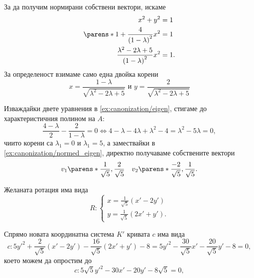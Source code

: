 \documentclass{../../common/topic}
\begin{document}
\begin{solution}
\begin{enumerate}
    За да получим нормирани собствени вектори, искаме
    \begin{align*}
      x^2 + y^2 &= 1 \\
      \parens*{1 +  \frac 4 {{(1 - \lambda)}^2} } x^2 &= 1 \\
      \frac {\lambda^2 - 2\lambda + 5} {{(1 - \lambda)}^2} x^2 &= 1.
    \end{align*}
    За определеност взимаме само една двойка корени
    \begin{equation}
      \label{ex:canonization/normed_eigen}
      x = \frac {1 - \lambda} {\sqrt{\lambda^2 - 2\lambda + 5}}
      \text{ и }
      y = \frac 2 {\sqrt{\lambda^2 - 2\lambda + 5}}
    \end{equation}

    Изваждайки двете уравнения в \eqref{ex:canonization/eigen}, стигаме до характеристичния полином на \( A \):
    \begin{equation*}
      \frac {4 - \lambda} 2 - \frac 2 {1 - \lambda} = 0 \iff 4 - \lambda - 4\lambda + \lambda^2 - 4 = \lambda^2 - 5\lambda = 0,
    \end{equation*}
    чиито корени са \( \lambda_1 = 0 \) и \( \lambda_1 = 5 \), а замествайки в \eqref{ex:canonization/normed_eigen}, директно получаваме собствените вектори
    \begin{align*}
      v_1 \parens*{\frac 1 {\sqrt 5}, \frac 2 {\sqrt 5} }
      &&
      v_2 \parens*{\frac {-2} {\sqrt 5}, \frac 1 {\sqrt 5} }.
    \end{align*}

    Желаната ротация има вида
    \begin{equation*}
      R: \begin{cases}
        x = \frac 1 {\sqrt 5} (x' - 2y') \\
        y = \frac 1 {\sqrt 5} (2x' + y').
      \end{cases}
    \end{equation*}

    Спрямо новата координатна система \( K' \) кривата \( c \) има вида
    \begin{equation*}
      c: 5y'^2 + \frac 2 {\sqrt 5} (x' - 2y') - \frac {16} {\sqrt 5} (2x' + y') - 8 = 5y'^2 - \frac {30} {\sqrt 5} x' - \frac {20} {\sqrt 5} y' - 8 = 0,
    \end{equation*}
    което можем да опростим до
    \begin{equation*}
      c: 5 \sqrt 5 y'^2 - 30 x' - 20 y' - 8 \sqrt 5 = 0,
    \end{equation*}


\end{enumerate}
\end{solution}
\end{document}
